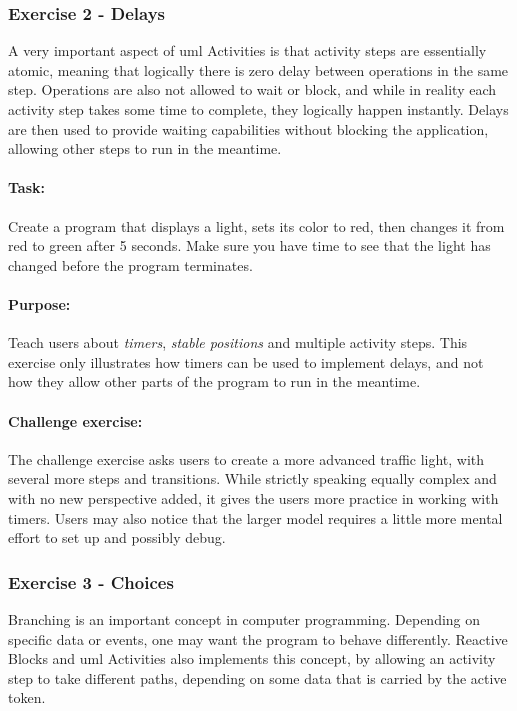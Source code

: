 \subsubsection{Exercise 2 - Delays}
A very important aspect of \gls{uml} Activities is that activity steps are essentially atomic, meaning that logically there is zero delay between operations in the same step. Operations are also not allowed to wait or block, and while in reality each activity step takes some time to complete, they logically happen instantly. Delays are then used to provide waiting capabilities without blocking the application, allowing other steps to run in the meantime.

\paragraph{Task:} Create a program that displays a light, sets its color to red, then changes it from red to green after 5 seconds. Make sure you have time to see that the light has changed before the program terminates.

\paragraph{Purpose:} Teach users about \emph{timers}, \emph{stable positions} and multiple activity steps. This exercise only illustrates how timers can be used to implement delays, and not how they allow other parts of the program to run in the meantime.

\paragraph{Challenge exercise:} The challenge exercise asks users to create a more advanced traffic light, with several more steps and transitions. While strictly speaking equally complex and with no new perspective added, it gives the users more practice in working with timers. Users may also notice that the larger model requires a little more mental effort to set up and possibly debug.

\subsubsection{Exercise 3 - Choices}
Branching is an important concept in computer programming. Depending on specific data or events, one may want the program to behave differently. Reactive Blocks and \gls{uml} Activities also implements this concept, by allowing an activity step to take different paths, depending on some data that is carried by the active token.

